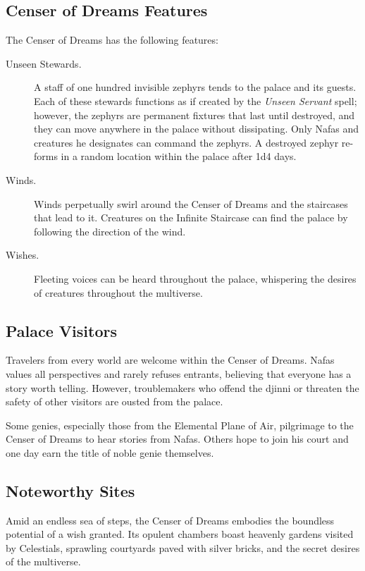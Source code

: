 \documentclass[10pt,a4paper,twoside,bg=print,twocolumn,openany,nodeprecatedcode]{dndbook}
\begin{document}
\subsection{Censer of Dreams Features}
The Censer of Dreams has the following features:


\begin{description}
\item[Unseen Stewards.]
A staff of one hundred invisible zephyrs tends to the palace and its guests. Each of these stewards functions as if created by the \textit{Unseen Servant} spell; however, the zephyrs are permanent fixtures that last until destroyed, and they can move anywhere in the palace without dissipating. Only Nafas and creatures he designates can command the zephyrs. A destroyed zephyr re-forms in a random location within the palace after 1d4 days.
\item[Winds.]
Winds perpetually swirl around the Censer of Dreams and the staircases that lead to it. Creatures on the Infinite Staircase can find the palace by following the direction of the wind.
\item[Wishes.]
Fleeting voices can be heard throughout the palace, whispering the desires of creatures throughout the multiverse.
\end{description}

\subsection{Palace Visitors}
Travelers from every world are welcome within the Censer of Dreams. Nafas values all perspectives and rarely refuses entrants, believing that everyone has a story worth telling. However, troublemakers who offend the djinni or threaten the safety of other visitors are ousted from the palace.

Some genies, especially those from the Elemental Plane of Air, pilgrimage to the Censer of Dreams to hear stories from Nafas. Others hope to join his court and one day earn the title of noble genie themselves.

\subsection{Noteworthy Sites}
Amid an endless sea of steps, the Censer of Dreams embodies the boundless potential of a wish granted. Its opulent chambers boast heavenly gardens visited by Celestials, sprawling courtyards paved with silver bricks, and the secret desires of the multiverse.
\end{document}
